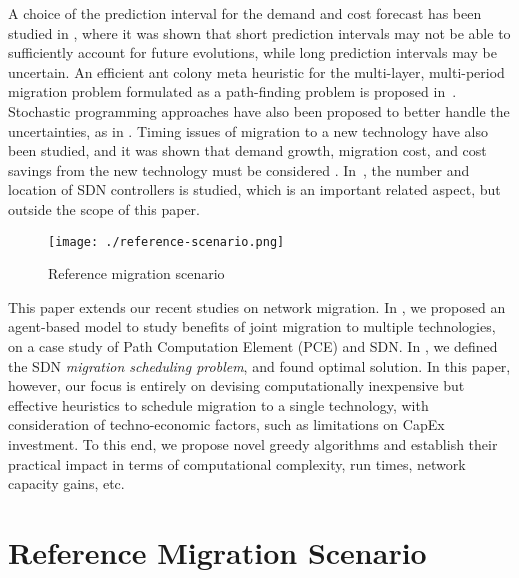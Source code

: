 \documentclass[conference]{IEEEtran}
\begin{document}
\par A choice of the prediction interval for the demand and cost forecast has
been studied in \cite{Verbrugge}, where it was shown that short prediction
intervals may not be able to sufficiently account for future evolutions, while
long prediction intervals may be uncertain. An efficient ant colony meta
heuristic for the multi-layer, multi-period migration problem formulated as a
path-finding problem is proposed in~\cite{antColony}. Stochastic programming
approaches have also been proposed to better handle the uncertainties, as in
\cite{Schupke}.
Timing issues of migration to a new technology have also been studied, and it
was shown that demand growth, migration cost, and cost savings from the new
technology must be considered \cite{Rajagopalan}. In~\cite{McKeown}, the number
and location of SDN controllers is studied, which is an important related
aspect, but outside the scope of this paper.

\begin{figure}[t]
\begin{center}
\texttt{[image: ./reference-scenario.png]}
\caption{Reference migration scenario}
\label{fig:reference-migration-scenario}
\end{center}
\vspace{-5mm}
\end{figure}

\par This paper extends our recent studies on network migration.
In \cite{netmig-icc2012}, we proposed an agent-based model to study benefits of
joint migration to multiple technologies, on a case study of Path Computation
Element (PCE) and SDN. In \cite{caria-sdn-migration}, we defined the SDN
\emph{migration scheduling problem}, and found optimal solution.
In this paper, however, our focus is entirely on devising computationally
inexpensive but effective heuristics to schedule migration to a single
technology, with consideration of techno-economic factors, such as limitations
on CapEx investment. To this end, we propose novel greedy algorithms and
establish their practical impact in terms of computational complexity, run
times, network capacity gains, etc.

\section{Reference Migration Scenario}\label{sec:reference-scenario}
\end{document}

